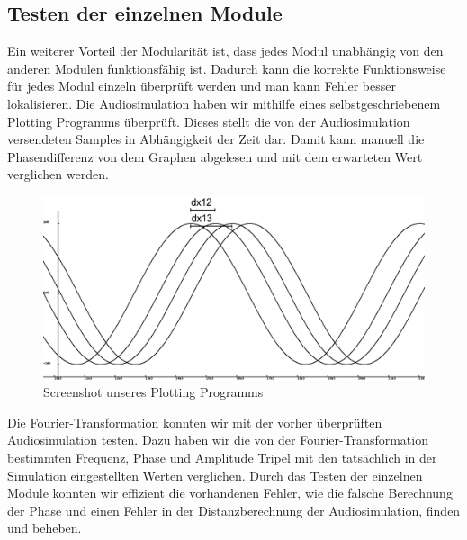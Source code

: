 \subsection{Testen der einzelnen Module}
Ein weiterer Vorteil der Modularität ist, dass jedes Modul unabhängig von den anderen Modulen funktionsfähig ist. Dadurch kann die korrekte Funktionsweise für jedes Modul einzeln überprüft werden und man kann Fehler besser lokalisieren.
Die Audiosimulation haben wir mithilfe eines selbstgeschriebenem Plotting Programms überprüft. Dieses stellt die von der Audiosimulation versendeten Samples in Abhängigkeit der Zeit dar. Damit kann manuell die Phasendifferenz von dem Graphen abgelesen und mit dem erwarteten Wert verglichen werden.
\begin{figure} [H]
  \includegraphics[width=\linewidth]{img/glplot}
  \caption{Screenshot unseres Plotting Programms}
  \label{fig:glplot}
\end{figure}

Die Fourier-Transformation konnten wir mit der vorher überprüften Audiosimulation testen. Dazu haben wir die von der Fourier-Transformation bestimmten Frequenz, Phase und Amplitude Tripel mit den tatsächlich in der Simulation eingestellten Werten verglichen.
Durch das Testen der einzelnen Module konnten wir effizient die vorhandenen Fehler, wie die falsche Berechnung der Phase und einen Fehler in der Distanzberechnung der Audiosimulation, finden und beheben.

